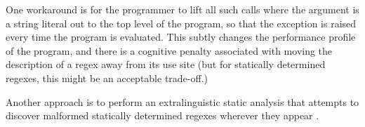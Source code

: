 \begin{enumerate}
One workaround is for the programmer to lift all such calls where the argument is a string literal out to the top level of the program, so that the exception is raised every time the program is evaluated. This subtly changes the performance profile of the program, and there is a cognitive penalty associated with moving the description of a regex away from its use site (but for statically determined regexes, this might be an acceptable trade-off.)%

Another approach is to perform an extralinguistic static analysis that attempts to discover malformed statically determined regexes wherever they appear \cite{spishak2012type}.




\end{enumerate}
